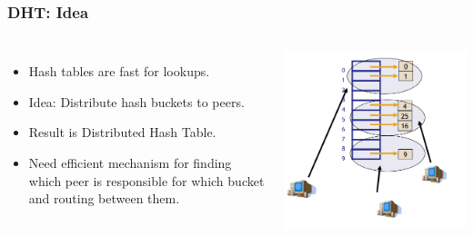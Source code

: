 \begin{frame}
    \frametitle{DHT: Idea}
    \begin{columns}
        \begin{itemize}
            \item Hash tables are fast for lookups.
            \item Idea: Distribute hash buckets to peers.
            \item Result is \alert{Distributed Hash Table}.
            \item Need efficient mechanism for finding which peer is responsible for which bucket and routing between them.
        \end{itemize}
            \includegraphics[scale=0.3]{figures/dht_idea.png}
    \end{columns}
\end{frame}

